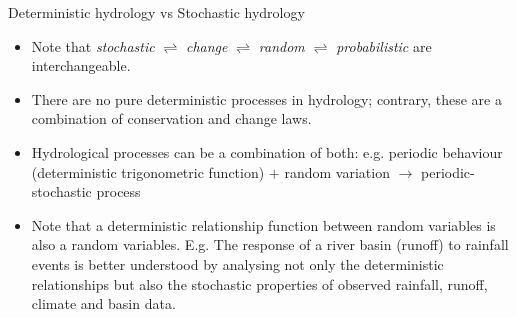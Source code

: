 \documentclass[8pt]{beamer}
\begin{document}
\begin{frame}{Deterministic hydrology vs Stochastic hydrology}
    
   \begin{itemize}
        \item Note that \emph{stochastic} $\rightleftharpoons$ \emph{change} $\rightleftharpoons$ \emph{random} $\rightleftharpoons$ \emph{probabilistic} are interchangeable. 
        \item There are no pure deterministic processes in hydrology; contrary, these are a combination of conservation and change laws.  
        \item Hydrological processes can be a combination of both: e.g. periodic behaviour (deterministic trigonometric function) $+$ random variation  $\rightarrow$ \alert{periodic-stochastic process}
        \item Note that a deterministic relationship function between random variables is also a random variables. E.g. The response of a river basin (runoff) to rainfall events is better understood by analysing not only the deterministic relationships but also the stochastic properties of observed rainfall, runoff, climate and basin data. 
    \end{itemize}
\end{frame}
\end{document}
